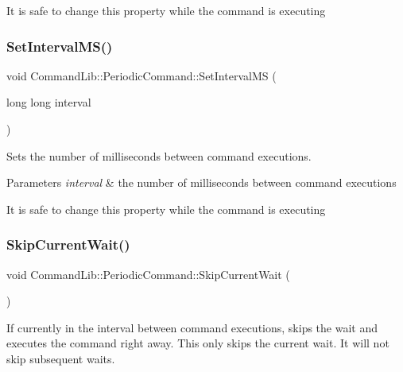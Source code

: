 It is safe to change this property while the command is executing\mbox{\label{class_command_lib_1_1_periodic_command_ae4f9588a25154969bfb9dbf10cf5e367}} 
\subsubsection{\texorpdfstring{Set\+Interval\+M\+S()}{SetIntervalMS()}}
{\footnotesize\ttfamily void Command\+Lib\+::\+Periodic\+Command\+::\+Set\+Interval\+MS (\begin{DoxyParamCaption}\item[{long long}]{interval }\end{DoxyParamCaption})}



Sets the number of milliseconds between command executions. 


\begin{DoxyParams}{Parameters}
{\em interval} & the number of milliseconds between command executions\\
\hline
\end{DoxyParams}


It is safe to change this property while the command is executing\mbox{\label{class_command_lib_1_1_periodic_command_a537aa24d843d7ca7a4fe1d9a9e5f1d24}} 
\subsubsection{\texorpdfstring{Skip\+Current\+Wait()}{SkipCurrentWait()}}
{\footnotesize\ttfamily void Command\+Lib\+::\+Periodic\+Command\+::\+Skip\+Current\+Wait (\begin{DoxyParamCaption}{ }\end{DoxyParamCaption})}



If currently in the interval between command executions, skips the wait and executes the command right away. This only skips the current wait. It will not skip subsequent waits. 

